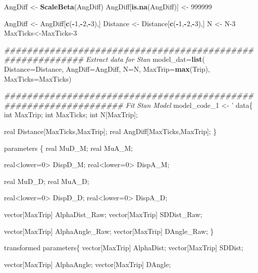 \documentclass[
]{article}
\newenvironment{Shaded}{\begin{snugshade}}{\end{snugshade}}
\newcommand{\CommentTok}[1]{\textcolor[rgb]{0.56,0.35,0.01}{\textit{#1}}}
\newcommand{\DataTypeTok}[1]{\textcolor[rgb]{0.13,0.29,0.53}{#1}}
\newcommand{\DecValTok}[1]{\textcolor[rgb]{0.00,0.00,0.81}{#1}}
\newcommand{\KeywordTok}[1]{\textcolor[rgb]{0.13,0.29,0.53}{\textbf{#1}}}
\newcommand{\NormalTok}[1]{#1}
\newcommand{\OperatorTok}[1]{\textcolor[rgb]{0.81,0.36,0.00}{\textbf{#1}}}
\newcommand{\StringTok}[1]{\textcolor[rgb]{0.31,0.60,0.02}{#1}}
\begin{document}
\begin{Shaded}
\begin{Highlighting}[]
{\NormalTok{ AngDiff <-}\StringTok{ }\KeywordTok{ScaleBeta}\NormalTok{(AngDiff)}
\NormalTok{ AngDiff[}\KeywordTok{is.na}\NormalTok{(AngDiff)] <-}\StringTok{ }\DecValTok{999999}

\NormalTok{ AngDiff <-}\StringTok{ }\NormalTok{AngDiff[}\KeywordTok{c}\NormalTok{(}\OperatorTok{-}\DecValTok{1}\NormalTok{,}\OperatorTok{-}\DecValTok{2}\NormalTok{,}\OperatorTok{-}\DecValTok{3}\NormalTok{),]}
\NormalTok{ Distance <-}\StringTok{ }\NormalTok{Distance[}\KeywordTok{c}\NormalTok{(}\OperatorTok{-}\DecValTok{1}\NormalTok{,}\OperatorTok{-}\DecValTok{2}\NormalTok{,}\OperatorTok{-}\DecValTok{3}\NormalTok{),]}
\NormalTok{ N <-}\StringTok{ }\NormalTok{N}\DecValTok{-3}
\NormalTok{ MaxTicks<-MaxTicks}\DecValTok{-3}


\CommentTok{########################################################## Extract data for Stan    }
\NormalTok{model_dat=}\KeywordTok{list}\NormalTok{(}
\DataTypeTok{Distance=}\NormalTok{Distance, }
\DataTypeTok{AngDiff=}\NormalTok{AngDiff,}
\DataTypeTok{N=}\NormalTok{N,}
\DataTypeTok{MaxTrip=}\KeywordTok{max}\NormalTok{(Trip),}
\DataTypeTok{MaxTicks=}\NormalTok{MaxTicks)}

\CommentTok{################################################################# Fit Stan Model}
\NormalTok{model_code_}\DecValTok{1}\NormalTok{ <-}\StringTok{ '}
\StringTok{data\{}
\StringTok{int MaxTrip;}
\StringTok{int MaxTicks;}
\StringTok{int N[MaxTrip];}

\StringTok{real Distance[MaxTicks,MaxTrip];}
\StringTok{real AngDiff[MaxTicks,MaxTrip];}
\StringTok{\}}

\StringTok{parameters \{}
\StringTok{ real MuD_M;}
\StringTok{ real MuA_M;}

\StringTok{ real<lower=0> DispD_M;}
\StringTok{ real<lower=0> DispA_M;}

\StringTok{ real MuD_D;}
\StringTok{ real MuA_D;}

\StringTok{ real<lower=0> DispD_D;}
\StringTok{ real<lower=0> DispA_D;}

\StringTok{ vector[MaxTrip] AlphaDist_Raw;}
\StringTok{ vector[MaxTrip] SDDist_Raw; }

\StringTok{ vector[MaxTrip] AlphaAngle_Raw;}
\StringTok{ vector[MaxTrip] DAngle_Raw; }
\StringTok{\}}

\StringTok{transformed parameters\{}
\StringTok{ vector[MaxTrip] AlphaDist;}
\StringTok{ vector[MaxTrip] SDDist; }

\StringTok{ vector[MaxTrip] AlphaAngle;}
\StringTok{ vector[MaxTrip] DAngle; }

}
\end{Highlighting}
\end{Shaded}
\end{document}
